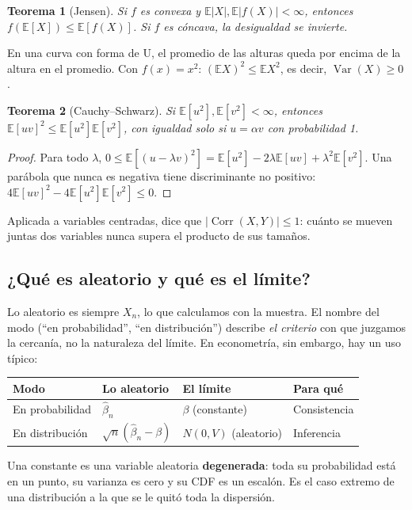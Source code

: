 \documentclass[11pt,a4paper]{article}
\theoremstyle{plain}
\newtheorem{teorema}{Teorema}[section]
\theoremstyle{definition}
\theoremstyle{remark}
\newcommand{\E}{\mathbb{E}}
\DeclareMathOperator{\Var}{Var}
\DeclareMathOperator{\Corr}{Corr}
\begin{document}
\begin{teorema}[Jensen]\label{teo:jensen}
Si $f$ es convexa y $\E|X|,\E|f(X)|<\infty$, entonces $f(\E[X])\le\E[f(X)]$. Si $f$ es cóncava,
la desigualdad se invierte.
\end{teorema}

En una curva con forma de U, el promedio de las alturas queda por encima de la altura en el
promedio. Con $f(x)=x^2$: $(\E X)^2\le\E X^2$, es decir, $\Var(X)\ge0$.

\begin{teorema}[Cauchy--Schwarz]\label{teo:cs}
Si $\E[u^2],\E[v^2]<\infty$, entonces $\E[uv]^2\le\E[u^2]\E[v^2]$, con igualdad solo si
$u=\alpha v$ con probabilidad 1.
\end{teorema}
\begin{proof}
Para todo $\lambda$, $0\le\E[(u-\lambda v)^2]=\E[u^2]-2\lambda\E[uv]+\lambda^2\E[v^2]$. Una
parábola que nunca es negativa tiene discriminante no positivo:
$4\E[uv]^2-4\E[u^2]\E[v^2]\le0$.
\end{proof}

Aplicada a variables centradas, dice que $|\Corr(X,Y)|\le1$: cuánto se mueven juntas dos
variables nunca supera el producto de sus tamaños.

\subsection{¿Qué es aleatorio y qué es el límite?}

Lo aleatorio es siempre $X_n$, lo que calculamos con la muestra. El nombre del modo
(``en probabilidad'', ``en distribución'') describe \emph{el criterio} con que juzgamos la
cercanía, no la naturaleza del límite. En econometría, sin embargo, hay un uso típico:

\begin{center}
\begin{tabular}{@{}llll@{}}
\toprule
Modo & Lo aleatorio & El límite & Para qué \\
\midrule
En probabilidad & $\hat\beta_n$ & $\beta$ (constante) & Consistencia \\
En distribución & $\sqrt n(\hat\beta_n-\beta)$ & $N(0,V)$ (aleatorio) & Inferencia \\
\bottomrule
\end{tabular}
\end{center}

Una constante es una variable aleatoria \textbf{degenerada}: toda su probabilidad está en un
punto, su varianza es cero y su CDF es un escalón. Es el caso extremo de una distribución a la
que se le quitó toda la dispersión.
\end{document}
